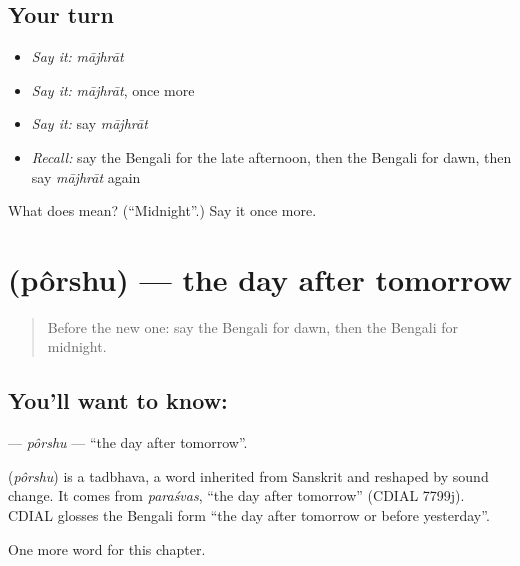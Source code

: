 \subsection*{Your turn}
\begin{itemize}
\raggedright
  \item \emph{Say it:} \emph{mājhrāt}
  \item \emph{Say it:} \emph{mājhrāt}, once more
  \item \emph{Say it:} say \emph{mājhrāt}
  \item \emph{Recall:} say the Bengali for the late afternoon, then the Bengali for dawn, then say \emph{mājhrāt} again
\end{itemize}

\begin{tcolorbox}[breakable,colback=teal!4,colframe=teal!35!black,title={Before you move on}]
What does  mean? (\textquotedblleft{}Midnight\textquotedblright{}.) Say it once more.
\end{tcolorbox}
\section[\texorpdfstring{\bn{পরশু} (pôrshu)}{পরশু (pôrshu)}]{ (pôrshu) — the day after tomorrow}

\label{lesson:BN-C90-porshu}



\begin{quote}
Before the new one: say the Bengali for dawn, then the Bengali for midnight.
\end{quote}

\subsection*{You'll want to know: }
\textbf{} — \emph{pôrshu} — \textquotedblleft{}the day after tomorrow\textquotedblright{}.

\begin{cousinweb}
\textbf{} (\emph{pôrshu}) is a tadbhava, a word inherited from Sanskrit and reshaped by sound change. It comes from \emph{paraśvas}, \textquotedblleft{}the day after tomorrow\textquotedblright{} (CDIAL 7799j). CDIAL glosses the Bengali form \textquotedblleft{}the day after tomorrow or before yesterday\textquotedblright{}.
\end{cousinweb}

\begin{grammarlens}[title={What you've built}]
One more word for this chapter.
\end{grammarlens}

